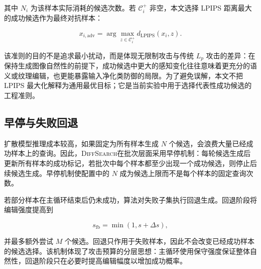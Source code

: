 \documentclass[type=bachelor,oneside]{fduthesis}
\newcommand{\methodname}{\textsc{DiffSearch}}
\begin{document}
其中 $N_i$ 为该样本实际消耗的候选次数。若 $\mathcal{C}_i^+$ 非空，本文选择 LPIPS 距离最大的成功候选作为最终对抗样本：

\begin{equation}
  x_{i,\text{adv}} =
  \arg\max_{z\in\mathcal{C}_i^+}
  d_{\text{LPIPS}}(x_i,z).
  \label{eq:lpips_selection}
\end{equation}

该准则的目的不是追求最小扰动，而是体现无限制攻击与传统 $L_p$ 攻击的差异：在保持生成图像自然性的前提下，成功候选中更大的感知变化往往意味着更充分的语义或纹理编辑，也更能暴露输入净化类防御的局限。为了避免误解，本文不把 LPIPS 最大化解释为通用最优目标；它是当前实验中用于选择代表性成功候选的工程准则。

\subsection{早停与失败回退}

扩散模型推理成本较高，如果固定为所有样本生成 $N$ 个候选，会浪费大量已经成功样本上的查询。因此，\methodname 在批次层面采用早停机制：每轮候选生成后更新所有样本的成功标记，若批次中每个样本都至少出现一个成功候选，则停止后续候选生成。早停机制使配置中的 $N$ 成为候选上限而不是每个样本的固定查询次数。

若部分样本在主循环结束后仍未成功，算法对失败子集执行回退生成。回退阶段将编辑强度提高到

\begin{equation}
  s_{\text{fb}} = \min(1, s+\Delta s),
  \label{eq:fallback_strength}
\end{equation}

并最多额外尝试 $M$ 个候选。回退只作用于失败样本，因此不会改变已经成功样本的候选选择。该机制体现了攻击预算的分层思想：主循环使用保守强度保证整体自然性，回退阶段只在必要时提高编辑幅度以增加成功概率。
\end{document}
